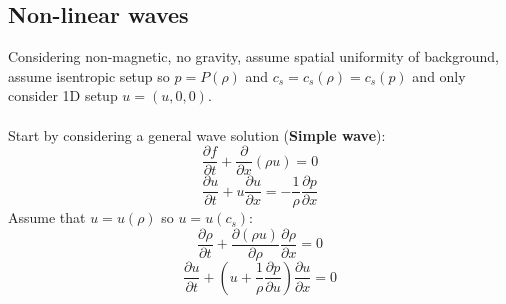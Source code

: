 \documentclass{article}
\begin{document}
\subsection{Non-linear waves}
Considering non-magnetic, no gravity, assume spatial uniformity of background, assume isentropic setup so $p= P(\rho)$ and $c_s = c_s(\rho) = c_s(p)$ and only consider 1D setup $u=(u,0,0)$.\\\\
Start by considering a general wave solution (\textbf{Simple wave}):
$$
\frac{\partial f}{\partial t} + \frac{\partial }{\partial x}(\rho u) = 0
$$
$$
\frac{\partial u}{\partial t} + u \frac{\partial u}{\partial x} = - \frac{1}{\rho} \frac{\partial p}{\partial x}
$$
Assume that $u= u(\rho)$ so $u= u(c_s)$:
\begin{equation}
\frac{\partial \rho}{\partial t} + \frac{\partial (\rho u)}{\partial \rho}\frac{\partial \rho}{\partial x} = 0
\end{equation}
\begin{equation}
        \frac{\partial u}{\partial t} + (u + \frac{1}{\rho}\frac{\partial p}{\partial u}) \frac{\partial u}{\partial x} = 0
\end{equation}
\end{document}
